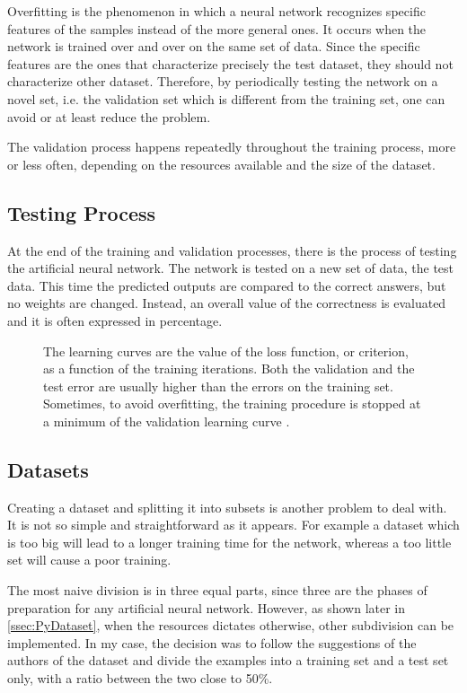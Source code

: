 Overfitting is the phenomenon in which a neural network recognizes specific features of the samples instead of the more general ones.
It occurs when the network is trained over and over on the same set of data.
Since the specific features are the ones that characterize precisely the test dataset, they should not characterize other dataset.
Therefore, by periodically testing the network on a novel set, i.e. the validation set which is different from the training set, one can avoid or at least reduce the problem.

The validation process happens repeatedly throughout the training process, more or less often, depending on the resources available and the size of the dataset.

\subsection{Testing Process}
\label{ssec:Testing_Process}
At the end of the training and validation processes, there is the process of testing the artificial neural network.
The network is tested on a new set of data, the test data.
This time the predicted outputs are compared to the correct answers, but no weights are changed.
Instead, an overall value of the correctness is evaluated and it is often expressed in percentage.

\begin{figure}[htbp]
	\centering
	
	\caption{The learning curves are the value of the loss function, or criterion, as a function of the training iterations.
	Both the validation and the test error are usually higher than the errors on the training set.
	Sometimes, to avoid overfitting, the training procedure is stopped at a minimum of the validation learning curve \cite{duda2012pattern}.
	}
	\label{fig:LVTcurves}
\end{figure}

\subsection{Datasets}
\label{ssec:Datasets}
Creating a dataset and splitting it into subsets is another problem to deal with.
It is not so simple and straightforward as it appears.
For example a dataset which is too big will lead to a longer training time for the network, whereas a too little set will cause a poor training.

The most naive division is in three equal parts, since three are the phases of preparation for any artificial neural network.
However, as shown later in \autoref{ssec:PyDataset}, when the resources dictates otherwise, other subdivision can be implemented.
In my case, the decision was to follow the suggestions of the authors of the dataset and divide the examples into a training set and a test set only, with a ratio between the two close to 50\%.

